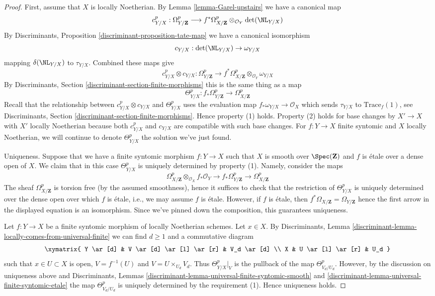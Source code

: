 \begin{proof}
First, assume that $X$ is locally Noetherian. By
Lemma \ref{lemma-Garel-upstairs} we have a canonical map
$$
c^p_{Y/X} : \Omega_{Y/\mathbf{Z}}^p
\longrightarrow
f^*\Omega_{X/\mathbf{Z}}^p \otimes_{\mathcal{O}_Y} \det(\NL_{Y/X})
$$
By Discriminants, Proposition \ref{discriminant-proposition-tate-map}
we have a canonical isomorphism
$$
c_{Y/X} : \det(\NL_{Y/X}) \to \omega_{Y/X}
$$
mapping $\delta(\NL_{Y/X})$ to $\tau_{Y/X}$. Combined these maps give
$$
c^p_{Y/X} \otimes c_{Y/X} :
\Omega_{Y/\mathbf{Z}}^p
\longrightarrow
f^*\Omega_{X/\mathbf{Z}}^p \otimes_{\mathcal{O}_Y} \omega_{Y/X}
$$
By Discriminants, Section \ref{discriminant-section-finite-morphisms}
this is the same thing as a map
$$
\Theta_{Y/X}^p :
f_*\Omega_{Y/\mathbf{Z}}^p
\longrightarrow
\Omega_{X/\mathbf{Z}}^p
$$
Recall that the relationship between $c^p_{Y/X} \otimes c_{Y/X}$
and $\Theta_{Y/X}^p$ uses the evaluation map
$f_*\omega_{Y/X} \to \mathcal{O}_X$
which sends $\tau_{Y/X}$ to $\text{Trace}_f(1)$, see
Discriminants, Section \ref{discriminant-section-finite-morphisms}.
Hence property (1) holds. Property (2) holds for base changes by
$X' \to X$ with $X'$ locally Noetherian because both $c^p_{Y/X}$ and
$c_{Y/X}$ are compatible with such base changes. For $f : Y \to X$
finite syntomic and $X$ locally Noetherian,
we will continue to denote $\Theta^p_{Y/X}$ the solution we've just found.

\medskip\noindent
Uniqueness. Suppose that we have a finite syntomic morphism
$f: Y \to X$ such that $X$ is smooth over $\Spec(\mathbf{Z})$
and $f$ is \'etale over a dense open of $X$. We claim that
in this case $\Theta^p_{Y/X}$ is uniquely determined by property (1).
Namely, consider the maps
$$
\Omega^p_{X/\mathbf{Z}} \otimes_{\mathcal{O}_X} f_*\mathcal{O}_Y \to
f_*\Omega^p_{Y/\mathbf{Z}} \to
\Omega^p_{X/\mathbf{Z}}
$$
The sheaf $\Omega^p_{X/\mathbf{Z}}$ is torsion free (by the assumed
smoothness), hence it suffices to check that the restriction of
$\Theta^p_{Y/X}$ is uniquely determined over the dense open over
which $f$ is \'etale, i.e., we may assume $f$ is \'etale.
However, if $f$ is \'etale, then
$f^*\Omega_{X/\mathbf{Z}} = \Omega_{Y/\mathbf{Z}}$
hence the first arrow in the displayed equation is an isomorphism.
Since we've pinned down the composition, this guarantees uniqueness.

\medskip\noindent
Let $f : Y \to X$ be a finite syntomic morphism of locally Noetherian schemes.
Let $x \in X$. By Discriminants, Lemma
\ref{discriminant-lemma-locally-comes-from-universal-finite}
we can find $d \geq 1$ and a commutative diagram
$$
\xymatrix{
Y \ar[d] &
V \ar[d] \ar[l] \ar[r] &
V_d \ar[d] \\
X &
U \ar[l] \ar[r] &
U_d
}
$$
such that $x \in U \subset X$ is open, $V = f^{-1}(U)$
and $V = U \times_{U_d} V_d$. Thus $\Theta^p_{Y/X}|_V$
is the pullback of the map $\Theta^p_{V_d/U_d}$.
However, by the discussion on uniqueness above and
Discriminants, Lemmas
\ref{discriminant-lemma-universal-finite-syntomic-smooth} and
\ref{discriminant-lemma-universal-finite-syntomic-etale}
the map $\Theta^p_{V_d/U_d}$ is uniquely determined
by the requirement (1). Hence uniqueness holds.


\end{proof}
